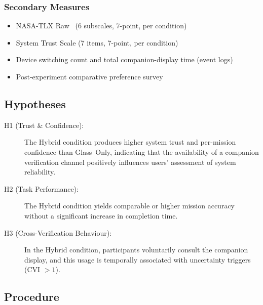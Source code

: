 \documentclass[review]{vgtc}           %
\begin{document}
\subsubsection{Secondary Measures}

\begin{itemize}
\item NASA-TLX Raw~\cite{Hart:1988:DOW} (6 subscales, 7-point, per condition)
\item System Trust Scale (7 items, 7-point, per condition)
\item Device switching count and total companion-display time (event logs)
\item Post-experiment comparative preference survey
\end{itemize}

\subsection{Hypotheses}

\begin{description}
\item[H1 (Trust \& Confidence):] The Hybrid condition produces higher
system trust and per-mission confidence than Glass~Only, indicating
that the availability of a companion verification channel positively
influences users' assessment of system reliability.

\item[H2 (Task Performance):] The Hybrid condition yields comparable
or higher mission accuracy without a significant increase in
completion time.

\item[H3 (Cross-Verification Behaviour):] In the Hybrid condition,
participants voluntarily consult the companion display, and this usage
is temporally associated with uncertainty triggers (CVI $> 1$).
\end{description}


\subsection{Procedure}
\end{document}
